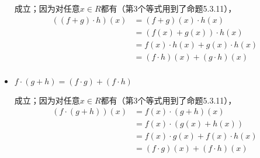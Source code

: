 \documentclass{article}
\begin{document}
\begin{itemize}
        成立；因为对任意$x \in R$都有（第3个等式用到了命题5.3.11），
        \begin{align*}
          ((f + g) \cdot h)(x) & = (f + g)(x) \cdot h(x)             \\
                               & = (f(x) + g(x))\cdot h(x)           \\
                               & = f(x) \cdot h(x) + g(x) \cdot h(x) \\
                               & = (f \cdot h)(x) + (g \cdot h)(x)   \\
        \end{align*}
  \item $f \cdot (g + h) = (f \cdot g) + (f \cdot h)$

        成立；因为对任意$x \in R$都有（第3个等式用到了命题5.3.11），
        \begin{align*}
          (f \cdot (g + h))(x) & = f(x) \cdot (g + h)(x)             \\
                               & = f(x) \cdot (g(x) + h(x))          \\
                               & = f(x) \cdot g(x) + f(x) \cdot h(x) \\
                               & = (f \cdot g)(x) + (f \cdot h)(x)   \\
        \end{align*}
\end{itemize}
\end{document}
